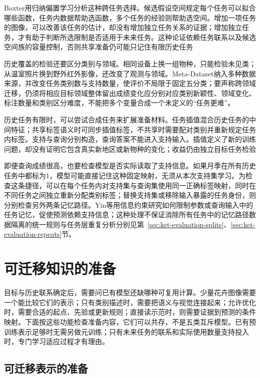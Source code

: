 Baxter用归纳偏置学习分析这种跨任务选择。候选假设空间规定每个任务可以拟合哪些函数，任务内数据帮助选函数，多个任务的经验则帮助选空间。增加一项任务的图像，可以改善该任务的估计，却没有增加独立任务关系的证据；增加独立任务，才有助于判断所选限制是否适用于未来任务。这种论证依赖任务联系以及候选空间族的容量控制，否则共享准备仍可能只记住有限历史任务

历史覆盖的检验还要区分类别与领域。相同设备上换一组物种，只能检验未见类；从温室照片换到野外红外影像，还改变了观测与领域。Meta-Dataset纳入多种数据来源，并改变任务类别数与支持数量，使评价不局限于固定五分类；要声称跨领域迁移，仍须将相应目标领域整体留出成绩变化应分别对应类别新颖性、领域变化、标注数量和类别区分难度，不能把多个变量合成一个未定义的“任务更难”。

历史任务有限时，可以尝试合成任务来扩展准备材料。任务插值混合历史任务的中间特征；共享标签语义时可同步插值标签，不共享时需要配对类别并重新规定任务内标签。支持与查询分别构造，查询答案不能进入支持输入。插值定义了新的训练问题，却没有证明它包含真实新地区或新物种的变化；收益仍由独立目标任务检验

即便查询成绩很高，也要检查模型是否实际读取了支持信息。如果月季在所有历史任务中都标为1，模型可能直接记住这种固定映射，无须从本次支持集学习。为检查这条捷径，可以在每个任务内对支持集与查询集使用同一正确标签映射，同时在不同任务之间独立重新分配类别标签；替换支持集或移除输入暴露的任务身份，则分别检查另外两条记忆路径。Yin等用信息约束研究如何限制参数或查询输入中的任务记忆，促使预测依赖支持信息；这种处理不保证消除所有任务中的记忆路径数据隔离的统一规则与任务层重复分析分别见第~\ref{sec:ket-evaluation-splits}、\ref{sec:ket-evaluation-repeats}节。

\section{可迁移知识的准备}
\label{sec:ket-transfer-preparation}

目标与历史联系确定后，需要问已有模型还缺哪种可复用计算。少量花卉图像需要一个能比较它们的表示；只有类别描述时，需要把语义与视觉连接起来；允许优化时，需要合适的起点、先验或更新规则；直接读示范时，则需要证据到预测的条件映射。下面按这些功能检查准备内容，它们可以共存，不是五类互斥模型。已有预训练表示足够时无需另做元训练；只有未来任务的联系和实际使用数量支持投入时，专门学习适应过程才有理由。

\subsection{可迁移表示的准备}
\label{sec:ket-transfer-representation}

